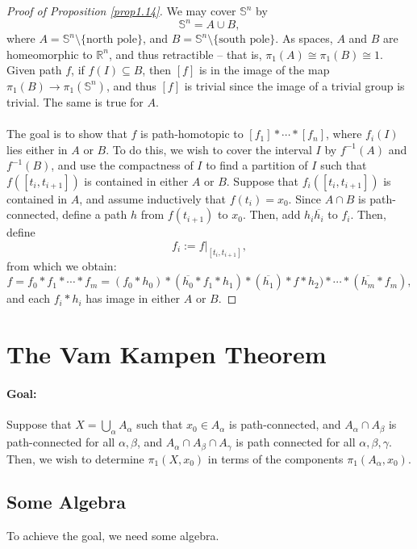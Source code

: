 \documentclass[a4paper]{report}
\theoremstyle{definition}
\theoremstyle{remark}
\theoremstyle{proposition}
\theoremstyle{conjecture}
\theoremstyle{lemma}
\theoremstyle{corollary}
\theoremstyle{exercise}
\begin{document}
\begin{proof}[Proof of Proposition \ref{prop1.14}]
    We may cover $\mathbb{S}^n$ by $$\mathbb{S}^n = A \cup B,$$
    where $A = \mathbb{S}^n \setminus \lbrace \text{north pole}\rbrace$,
    and $B = \mathbb{S}^n \setminus \lbrace \text{south pole}\rbrace$.
    As spaces, $A$ and $B$ are homeomorphic to $\mathbb{R}^n$, and 
    thus retractible -- that is, $\pi_1(A) \cong \pi_1(B) \cong 1$.
    Given path $f$, if $f(I) \subseteq B$, then $[f]$ is in the 
    image of the map $\pi_1(B) \to \pi_1(\mathbb{S}^n)$, and thus $[f]$ 
    is trivial since the image of a trivial group is trivial.
    The same is true for $A$.\\\\
    The goal is to show that $f$ is path-homotopic to $[f_1]\ast \cdots \ast [f_n]$, where $f_i(I)$ lies either in $A$ or $B$. To do this, we wish to cover
    the interval $I$ by $f^{-1}(A)$ and $f^{-1}(B)$, and use the compactness
    of $I$ to find a partition of $I$ such that $f([t_i,t_{i+1}])$ is contained 
    in either $A$ or $B$.
    Suppose that $f_i([t_i,t_{i+1}])$ is contained in $A$, and assume
    inductively that $f(t_i) = x_0$. Since $A\cap B$ is path-connected,
    define a path $h$ from $f(t_{i+1})$ to $x_0$. Then, add
    $h_i\overline{h_i}$ to $f_i$. Then, 
    define $$f_i := f\vert_{[t_i,t_{i+1}]},$$
    from which we obtain:
    $$f = f_0 \ast f_1 \ast \cdots \ast f_m = (f_0 \ast h_0) \ast (\overline{h_0} \ast f_1 \ast h_1) \ast (\overline{h_1}) \ast f \ast h_2) \ast \cdots \ast (\overline{h_m}\ast f_m),$$
    and each $f_i \ast h_i$ has image in either $A$ or $B$.
\end{proof}

\section{The Vam Kampen Theorem}

\paragraph{Goal:} Suppose that $X = \bigcup_\alpha A_\alpha$ such that 
$x_0 \in A_\alpha$ is path-connected, and 
$A_\alpha \cap A_\beta$ is path-connected for all $\alpha,\beta$,
and $A_\alpha \cap A_\beta \cap A_\gamma$ is path connected for all
$\alpha,\beta,\gamma$.
Then, we wish to determine $\pi_1(X,x_0)$ in terms of the components
$\pi_1(A_\alpha, x_0)$.

\subsection{Some Algebra}
To achieve the goal, we need some algebra.
\end{document}
